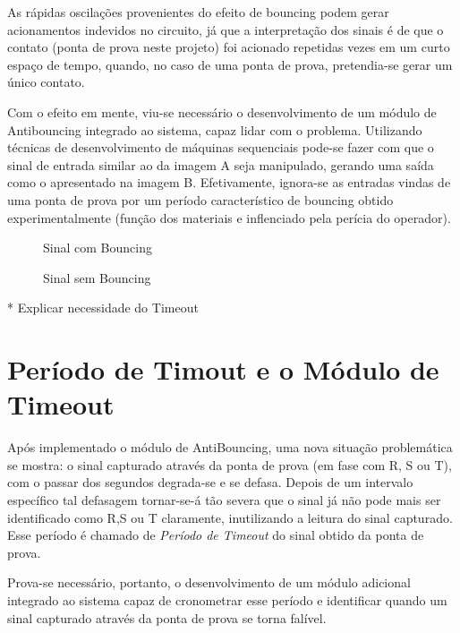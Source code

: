 \documentclass[12pt,a4paper,openany]{abntex2}
\begin{document}
As rápidas oscilações provenientes do efeito de bouncing podem
gerar acionamentos indevidos no circuito, já que a interpretação dos sinais é de que o contato (ponta de prova neste projeto) foi acionado repetidas vezes em um curto espaço de tempo, quando, no caso de uma ponta de prova, pretendia-se gerar um único contato.

Com o efeito em mente, viu-se necessário o desenvolvimento de um módulo de Antibouncing integrado ao sistema, capaz lidar com o problema. Utilizando técnicas de desenvolvimento de máquinas sequenciais pode-se fazer com que o sinal de entrada similar ao da imagem A seja manipulado, gerando uma saída como o apresentado na imagem B. Efetivamente, ignora-se as entradas vindas de uma ponta de prova por um período característico de bouncing obtido experimentalmente (função dos materiais e inflenciado pela perícia do operador).

\begin{figure}[!htp]
	\centering
	\caption{Sinal com Bouncing}
	\label{fig:sinal-com-bouncing}
\end{figure}

\begin{figure}[!htp]
	\centering
	\caption{Sinal sem Bouncing}
	\label{fig:sinal-sem-bouncing}
\end{figure}

* Explicar necessidade do Timeout
\section{Período de Timout e o Módulo de Timeout}

Após implementado o módulo de AntiBouncing, uma nova situação problemática se mostra: o sinal capturado através da ponta de prova (em fase com R, S ou T), com o passar dos segundos degrada-se e se defasa. Depois de um intervalo específico tal defasagem tornar-se-á
tão severa que o sinal já não pode mais ser identificado como R,S ou T claramente, inutilizando a leitura do sinal capturado. Esse período é chamado de \textit{Período de Timeout} do sinal obtido da ponta de prova.

Prova-se necessário, portanto, o desenvolvimento de um módulo adicional integrado ao sistema capaz de cronometrar esse período e identificar quando um sinal capturado através da ponta de prova se torna falível.
\end{document}
